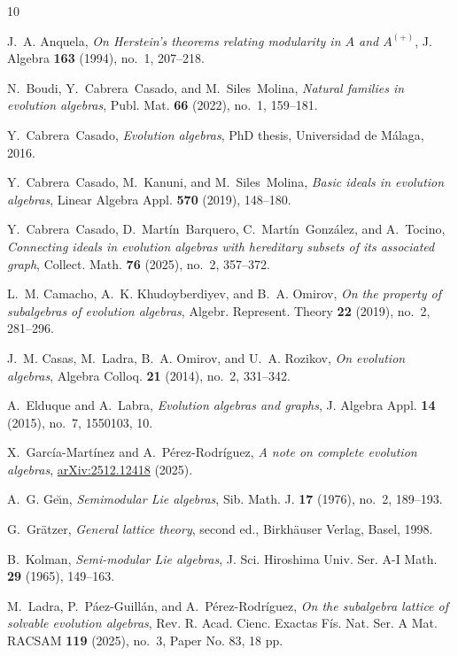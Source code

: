 \documentclass[12pt,reqno]{amsart}
\theoremstyle{plain}%
\theoremstyle{definition}
\theoremstyle{remark}
\numberwithin{equation}{section}
\begin{document}
\begin{thebibliography}{10}
	
	J.~A. Anquela, \emph{On {H}erstein's theorems relating modularity in {$A$} and
		{$A^{(+)}$}}, J. Algebra \textbf{163} (1994), no.~1, 207--218.
	
	N.~Boudi, Y.~Cabrera~Casado, and M.~Siles~Molina, \emph{Natural families in
		evolution algebras}, Publ. Mat. \textbf{66} (2022), no.~1, 159--181.
	
	Y.~Cabrera~Casado, \emph{Evolution algebras}, PhD thesis, Universidad de
	M\'alaga, 2016.
	
	Y.~Cabrera~Casado, M.~Kanuni, and M.~Siles~Molina, \emph{Basic ideals in
		evolution algebras}, Linear Algebra Appl. \textbf{570} (2019), 148--180.
	
	Y.~Cabrera~Casado, D.~Mart\'in~Barquero, C.~Mart\'in~Gonz\'alez, and A.~Tocino,
	\emph{Connecting ideals in evolution algebras with hereditary subsets of its
		associated graph}, Collect. Math. \textbf{76} (2025), no.~2, 357--372.
	
	L.~M. Camacho, A.~K. Khudoyberdiyev, and B.~A. Omirov, \emph{On the property of
		subalgebras of evolution algebras}, Algebr. Represent. Theory \textbf{22}
	(2019), no.~2, 281--296.
	
	J.~M. Casas, M.~Ladra, B.~A. Omirov, and U.~A. Rozikov, \emph{On evolution
		algebras}, Algebra Colloq. \textbf{21} (2014), no.~2, 331--342.
	
	A.~Elduque and A.~Labra, \emph{Evolution algebras and graphs}, J. Algebra Appl.
	\textbf{14} (2015), no.~7, 1550103, 10.
	
	X.~García-Martínez and A.~Pérez-Rodríguez, \emph{A note on complete
		evolution algebras}, 	\href{
		https://doi.org/10.48550/arXiv.2512.12418}{arXiv:2512.12418} (2025).
	
	A.~G. Ge{\u{\i}}n, \emph{Semimodular {L}ie algebras}, Sib. Math. J. \textbf{17}
	(1976), no.~2, 189--193.
	
	G.~Gr\"atzer, \emph{General lattice theory}, second ed., Birkh\"auser Verlag,
	Basel, 1998.
	
	B.~Kolman, \emph{Semi-modular {L}ie algebras}, J. Sci. Hiroshima Univ. Ser. A-I
	Math. \textbf{29} (1965), 149--163.
	
	M.~Ladra, P.~P\'aez-Guill\'an, and A.~P\'erez-Rodr\'iguez, \emph{On the
		subalgebra lattice of solvable evolution algebras}, Rev. R. Acad. Cienc.
	Exactas F\'is. Nat. Ser. A Mat. RACSAM \textbf{119} (2025), no.~3, Paper No.
	83, 18 pp.
	

\end{thebibliography}
\end{document}
